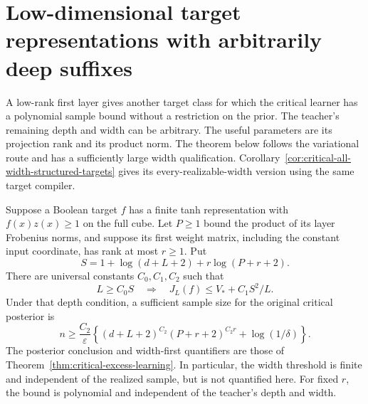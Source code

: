 \section{Low-dimensional target representations with arbitrarily deep suffixes}
\label{sec:critical-low-rank-targets}

A low-rank first layer gives another target class for which the
critical learner has a polynomial sample bound without a restriction
on the prior. The teacher's remaining depth and width can be arbitrary.
The useful parameters are its projection rank and its product norm.
The theorem below follows the variational route and has a sufficiently
large width qualification. Corollary~\ref{cor:critical-all-width-structured-targets}
gives its every-realizable-width version using the same target compiler.

\begin{theorem}
\label{thm:critical-low-rank-targets}
Suppose a Boolean target $f$ has a finite tanh representation with
$f(x)z(x)\ge1$ on the full cube. Let $P\ge1$ bound the product of
its layer Frobenius norms, and suppose its first weight matrix,
including the constant input coordinate, has rank at most $r\ge1$.
Put
\[
 S=1+\log(d+L+2)+r\log(P+r+2).
\]
There are universal constants $C_0,C_1,C_2$ such that
\[
 L\ge C_0S\quad\Longrightarrow\quad
 J_L(f)\le V_*+C_1S^2/L.
\]
Under that depth condition, a sufficient sample size for the original
critical posterior is
\[
 n\ge\frac{C_2}{\varepsilon}
 \left\{(d+L+2)^{C_2}(P+r+2)^{C_2r}
                    +\log(1/\delta)\right\}.
\]
The posterior conclusion and width-first quantifiers are those of
Theorem~\ref{thm:critical-excess-learning}. In particular, the width
threshold is finite and independent of the realized sample, but is
not quantified here. For fixed $r$, the bound is polynomial and
independent of the teacher's depth and width.
\end{theorem}


